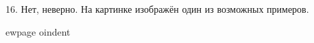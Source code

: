 16. Нет, неверно. На картинке изображён один из возможных примеров.
\begin{figure}[ht!]
\end{figure}
ewpage
oindent
